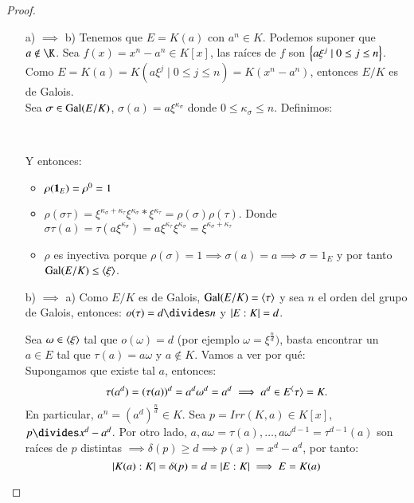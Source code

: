 \begin{proof}$ $
    \begin{enumerate}
        \item[a) $\implies$ b)] Tenemos que $E = K(a)$ con $a^n \in K$. Podemos suponer que $a \notin \K$. Sea $f(x) = x^n - a^n \in K[x]$, las raíces de $f$ son $\left\{a\xi^j \mid 0 \leq j \leq n\right\}$.
        Como $E = K(a) = K(a\xi^j\mid 0 \leq j \leq n) = K(x^n - a^n)$, entonces $E/K$ es de Galois.\\
        Sea $\sigma \in \mathrm{Gal}(E/K)$, $\sigma(a) = a\xi^{\kappa_\sigma}$ donde $0 \leq \kappa_\sigma \leq n$. Definimos:\\
        \begin{center}
            \\
        \end{center}
        Y entonces:
        \begin{itemize}
            \item $\rho(\mathbf{1}_E) = \rho^0 = 1$
            \item $\rho(\sigma\tau) = \xi^{\kappa_\sigma+\kappa_\tau} \xi^{\kappa_\sigma} * \xi^{\kappa_\tau} = \rho(\sigma)\rho(\tau)$.
            Donde $\sigma\tau(a) = \tau(a \xi^{\kappa_\sigma}) = a \xi^{\kappa_\tau} \xi^{\kappa_\sigma} = \xi^{\kappa_\sigma+\kappa_\tau}$
            \item $\rho$ es inyectiva porque $\rho(\sigma) = 1 \implies \sigma(a) = a \implies \sigma = 1_E$ y por tanto $\mathrm{Gal}(E/K) \leq \langle\xi\rangle$.
        \end{itemize}
        \item[b) $\implies$ a)] Como $E/K$ es de Galois, $\mathrm{Gal}(E/K) = \langle\tau\rangle$ y sea $n$ el orden del grupo de Galois, entonces: $o(\tau) = d\divides n$ y $\left|E:K\right| = d$.

        Sea $\omega \in\langle\xi\rangle$ tal que $o(\omega) = d$ (por ejemplo $\omega = \xi^{\frac{n}{d}})$, basta encontrar un $a \in E$ tal que $\tau(a) = a\omega$ y $a \notin K$. Vamos a ver por qué:\\
        Supongamos que existe tal $a$, entonces:
        $$
            \tau(a^d) = (\tau(a))^d = a^d \omega^d = a^d \implies a^d \in E^\langle\tau\rangle = K.
        $$
        En particular, $a^n = (a^d)^{\frac{n}{d}} \in K$. Sea $p = Irr(K, a) \in K[x]$, $p \divides x^d - a^d$.
        Por otro lado, $a, a\omega = \tau(a), \ldots, a\omega^{d-1} = \tau^{d-1}(a)$ son raíces de $p$ distintas $\implies \delta(p) \geq d \implies p(x) = x^d - a^d$, por tanto:
        $$
            \left|K(a):K\right| = \delta(p) = d = \left|E:K\right| \implies E = K(a)
        $$


\end{enumerate}
\end{proof}
